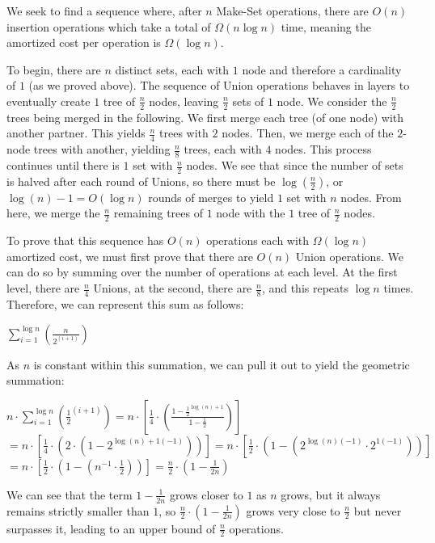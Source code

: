 \documentclass[11pt]{article}
\begin{document}
\begin{enumerate}
We seek to find a sequence where, after $n$ Make-Set operations, there are $O(n)$ insertion operations which take a total of $\Omega(n \log n)$ time, 
meaning the amortized cost per operation is $\Omega(\log n)$. 

To begin, there are $n$ distinct sets, each with $1$ node and therefore a cardinality of $1$ (as we proved above). 
The sequence of Union operations behaves in layers to eventually create $1$ tree of $\frac{n}{2}$ nodes, leaving $\frac{n}{2}$ sets of $1$ node. 
We consider the $\frac{n}{2}$ trees being merged in the following. 
We first merge each tree (of one node) with another partner. This yields $\frac{n}{4}$ trees with $2$ nodes. 
Then, we merge each of the $2$-node trees with another, yielding $\frac{n}{8}$ trees, each with $4$ nodes. 
This process continues until there is $1$ set with $\frac{n}{2}$ nodes. We see that since the number of sets is halved after each round of Unions, 
so there must be $\log (\frac{n}{2})$, or $\log (n) - 1 = O(\log n)$ rounds of merges to yield $1$ set with $n$ nodes. 
From here, we merge the $\frac{n}{2}$ remaining trees of $1$ node with the $1$ tree of $\frac{n}{2}$ nodes.

To prove that this sequence has $O(n)$ operations each with $\Omega(\log n)$ amortized cost, we must first prove that there are $O(n)$ Union operations. 
We can do so by summing over the number of operations at each level. At the first level, there are $\frac{n}{4}$ Unions, 
at the second, there are $\frac{n}{8}$, and this repeats $\log n$ times. Therefore, we can represent this sum as follows:

$\sum_{i = 1}^{\log n}(\frac{n}{2^{(i+1)}})$

As $n$ is constant within this summation, we can pull it out to yield the geometric summation:

$n \cdot \sum_{i = 1}^{\log n}(\frac{1}{2}^{(i+1)}) = n \cdot [\frac{1}{4} \cdot (\frac{1 - \frac{1}{2}^{\log (n) + 1}}{1 - \frac{1}{2}})]$
$= n \cdot [\frac{1}{4} \cdot (2 \cdot (1 - 2^{\log (n) + 1(-1)}))] = n \cdot [\frac{1}{2} \cdot (1 - (2^{\log (n)(-1)} \cdot 2^{1(-1)}))]$
$= n \cdot [\frac{1}{2} \cdot (1 - (n^{-1} \cdot \frac{1}{2}))] = \frac{n}{2} \cdot (1 - \frac{1}{2n})$

We can see that the term $1 - \frac{1}{2n}$ grows closer to $1$ as $n$ grows, but it always remains strictly smaller than $1$, 
so $\frac{n}{2} \cdot (1 - \frac{1}{2n})$ grows very close to $\frac{n}{2}$ but never surpasses it, leading to an upper bound of 
$\frac{n}{2}$ operations. 


\end{enumerate}
\end{document}
